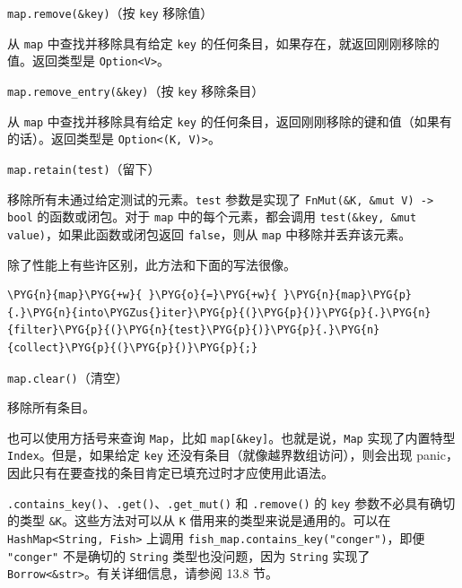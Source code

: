 \begin{myNote}
\texttt{map.remove(\&key)}（按 \texttt{key} 移除值）
\end{myNote}

从 \texttt{map} 中查找并移除具有给定 \texttt{key} 的任何条目，如果存在，就返回刚刚移除的值。返回类型是 \texttt{Option<V>}。

\begin{myNote}
\texttt{map.remove\_entry(\&key)}（按 \texttt{key} 移除条目）
\end{myNote}

从 \texttt{map} 中查找并移除具有给定 \texttt{key} 的任何条目，返回刚刚移除的键和值（如果有的话）。返回类型是 \texttt{Option<(K, V)>}。

\begin{mySidenote}
\texttt{map.retain(test)}（留下）
\end{mySidenote}

移除所有未通过给定测试的元素。\texttt{test} 参数是实现了 \texttt{FnMut(\&K, \&mut V) -> bool} 的函数或闭包。对于 \texttt{map} 中的每个元素，都会调用 \texttt{test(\&key, \&mut value)}，如果此函数或闭包返回 \texttt{false}，则从 \texttt{map} 中移除并丢弃该元素。

除了性能上有些许区别，此方法和下面的写法很像。

\begin{Verbatim}[commandchars=\\\{\},breaklines=true,breakanywhere=true,fontsize=\codefont,xleftmargin=17bp]
\PYG{n}{map}\PYG{+w}{ }\PYG{o}{=}\PYG{+w}{ }\PYG{n}{map}\PYG{p}{.}\PYG{n}{into\PYGZus{}iter}\PYG{p}{(}\PYG{p}{)}\PYG{p}{.}\PYG{n}{filter}\PYG{p}{(}\PYG{n}{test}\PYG{p}{)}\PYG{p}{.}\PYG{n}{collect}\PYG{p}{(}\PYG{p}{)}\PYG{p}{;}
\end{Verbatim}

\begin{mySidenote}
\texttt{map.clear()}（清空）
\end{mySidenote}

移除所有条目。

也可以使用方括号来查询 \texttt{Map}，比如 \texttt{map[\&key]}。也就是说，\texttt{Map} 实现了内置特型 \texttt{Index}。但是，如果给定 \texttt{key} 还没有条目（就像越界数组访问），则会出现 panic，因此只有在要查找的条目肯定已填充过时才应使用此语法。

\texttt{.contains\_key()}、\texttt{.get()}、\texttt{.get\_mut()} 和 \texttt{.remove()} 的 \texttt{key} 参数不必具有确切的类型 \texttt{\&K}。这些方法对可以从 \texttt{K} 借用来的类型来说是通用的。可以在 \texttt{HashMap<String, Fish>} 上调用 \texttt{fish\_map.contains\_key("conger")}，即便 \texttt{"conger"} 不是确切的 \texttt{String} 类型也没问题，因为 \texttt{String} 实现了 \texttt{Borrow<\&str>}。有关详细信息，请参阅 13.8 节。

